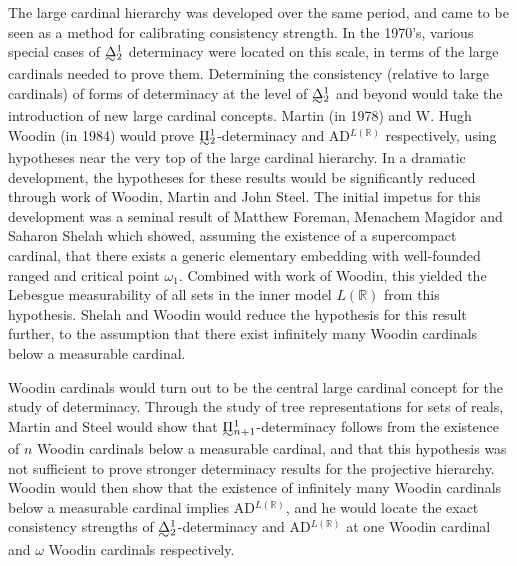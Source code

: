 \documentclass{book}%
\def\underTilde#1{{\baselineskip=0pt\vtop{\hbox{$#1$}\hbox{$\sim$}}}{}}
\newcommand{\uTDelta}{\underTilde{\Delta}}
\begin{document}
The large cardinal hierarchy was developed over the same period, and came to be seen as a method
for calibrating consistency strength. In the 1970's, various special cases of $\uTDelta^{1}_{2}$ determinacy were located
on this scale, in terms of the large cardinals needed to prove them. Determining the consistency (relative to large cardinals)
of forms of determinacy at the level of $\underTilde{\Delta}^{1}_{2}$ and beyond would take the introduction of new large cardinal concepts.
Martin (in 1978) and W. Hugh Woodin (in 1984) would prove $\underTilde{\Pi}^{1}_{2}$-determinacy
and AD$^{L(\mathbb{R})}$ respectively, using hypotheses near the very top of the large cardinal hierarchy.
In a dramatic development, the hypotheses for these results would be significantly reduced through work of Woodin, Martin and John Steel.
The initial impetus for this development was a seminal result of Matthew Foreman, Menachem Magidor and Saharon Shelah which showed, assuming the existence of a
supercompact cardinal, that there exists a generic elementary embedding with well-founded ranged and critical point $\omega_{1}$.
Combined with work of Woodin, this yielded the Lebesgue measurability of all sets in the inner model
$L(\mathbb{R})$ from this hypothesis. Shelah and Woodin would reduce the hypothesis for this result further,
to the assumption that there exist infinitely many Woodin cardinals below a measurable cardinal.

Woodin cardinals would turn out to be the central large cardinal concept for the study of determinacy.
Through the study of tree representations for sets of reals, Martin and Steel would show that $\underTilde{\Pi}^{1}_{n+1}$-determinacy
follows from the existence of $n$ Woodin cardinals below a measurable cardinal, and that this hypothesis was not sufficient
to prove stronger determinacy results for the projective hierarchy. Woodin would then show that the existence of infinitely
many Woodin cardinals below a measurable cardinal implies AD$^{L(\mathbb{R})}$, and he would locate the exact consistency strengths
of $\underTilde{\Delta}^{1}_{2}$-determinacy and AD$^{L(\mathbb{R})}$ at one Woodin cardinal and $\omega$ Woodin cardinals respectively.
\end{document}
